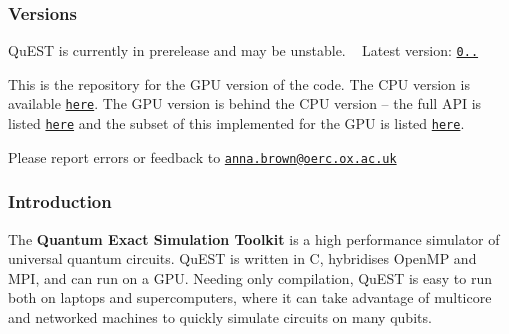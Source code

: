 \subsubsection*{Versions}

Qu\+E\+ST is currently in prerelease and may be unstable. ~\newline
 Latest version\+: \href{https://github.com/aniabrown/QuEST_GPU/releases/tag/v0.7.0}{\tt 0..}

This is the repository for the G\+PU version of the code. The C\+PU version is available \href{https://github.com/aniabrown/QuEST}{\tt here}. The G\+PU version is behind the C\+PU version -- the full A\+PI is listed \href{https://aniabrown.github.io/QuEST/qubits_8h.html}{\tt here} and the subset of this implemented for the G\+PU is listed \href{https://aniabrown.github.io/QuEST_GPU/qubits_8h.html}{\tt here}.

Please report errors or feedback to \href{mailto:anna.brown@oerc.ox.ac.uk}{\tt anna.\+brown@oerc.\+ox.\+ac.\+uk}

\subsubsection*{Introduction}

The {\bfseries Quantum Exact Simulation Toolkit} is a high performance simulator of universal quantum circuits. Qu\+E\+ST is written in C, hybridises Open\+MP and M\+PI, and can run on a G\+PU. Needing only compilation, Qu\+E\+ST is easy to run both on laptops and supercomputers, where it can take advantage of multicore and networked machines to quickly simulate circuits on many qubits.

